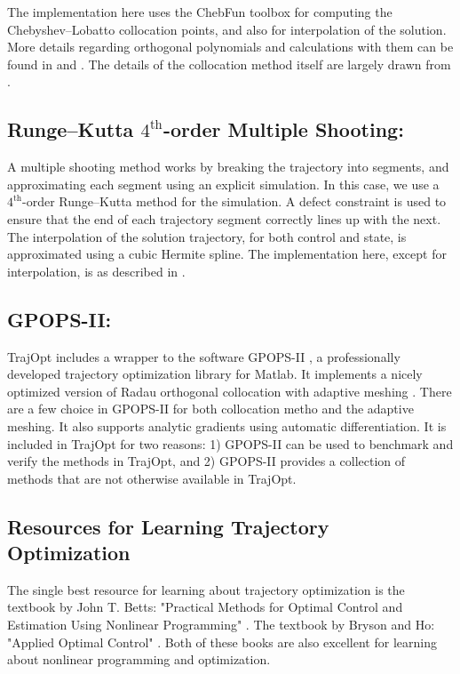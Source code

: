 \par The implementation here uses the ChebFun toolbox \cite{Driscoll2014} for computing the Chebyshev--Lobatto collocation points, and also for interpolation of the solution. More details regarding orthogonal polynomials and calculations with them can be found in \cite{Berrut2004a} and \cite{Trefethen2012}. The details of the collocation method itself are largely drawn from \cite{Vlassenbroeck1988}.

\subsection{Runge--Kutta $4^\text{th}$-order Multiple Shooting:  }

A multiple shooting method works by breaking the trajectory into segments, and approximating each segment using an explicit simulation. In this case, we use a $4^\text{th}$-order Runge--Kutta method for the simulation. A defect constraint is used to ensure that the end of each trajectory segment correctly lines up with the next. The interpolation of the solution trajectory, for both control and state, is approximated using a cubic Hermite spline. The implementation here, except for interpolation, is as described in \cite{Betts2010}.

\subsection{GPOPS-II:    }

TrajOpt includes a wrapper to the software GPOPS-II \cite{Patterson2013}, a professionally developed trajectory optimization library for Matlab. It implements a nicely optimized version of Radau orthogonal collocation with adaptive meshing \cite{Darby2011a}. There are a few choice in GPOPS-II for both collocation metho and the adaptive meshing. It also supports analytic gradients using automatic differentiation. It is included in TrajOpt for two reasons: 1) GPOPS-II can be used to benchmark and verify the methods in TrajOpt, and 2) GPOPS-II provides a collection of methods that are not otherwise available in TrajOpt.

\subsection{Resources for Learning Trajectory Optimization}

The single best resource for learning about trajectory optimization is the textbook by John T. Betts: "Practical Methods for Optimal Control and Estimation Using Nonlinear Programming" \cite{Betts2010}. The textbook by Bryson and Ho: "Applied Optimal Control" \cite{Bryson1975}. Both of these books are also excellent for learning about nonlinear programming and optimization.\\

